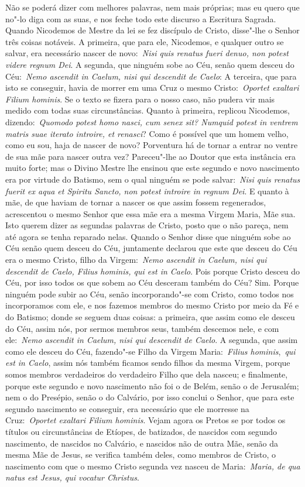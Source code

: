 Não se poderá dizer com melhores palavras, nem mais
próprias; mas eu quero que no"-lo diga com as suas, e nos feche todo este
discurso a Escritura Sagrada. Quando Nicodemos de Mestre da lei se fez
discípulo de Cristo, disse"-lhe o Senhor três coisas notáveis. A
primeira, que para ele, Nicodemos, e qualquer outro se salvar, era
necessário nascer de novo:~\emph{Nisi quis renatus fueri denuo, non
potest videre regnum Dei}. A segunda, que ninguém sobe
ao Céu, senão quem desceu do Céu:~\emph{Nemo ascendit in Caelum, nisi
qui descendit de Caelo}: A terceira, que para isto se
conseguir, havia de morrer em uma Cruz o mesmo Cristo:~\emph{Oportet
exaltari Filium hominis}. Se o texto se fizera para o
nosso caso, não pudera vir mais medido com todas suas circunstâncias.
Quanto à primeira, replicou Nicodemos, dizendo:~\emph{Quomodo potest
homo nasci, cum senex sit? Numquid potest in ventrem matris suae iterato
introire, et renasci}? Como é possível que um homem velho, como eu sou,
haja de nascer de novo? Porventura há de tornar a entrar no ventre de
sua mãe para nascer outra vez? Pareceu"-lhe ao Doutor que esta instância
era muito forte; mas o Divino Mestre lhe ensinou que este segundo e novo
nascimento era por virtude do Batismo, sem o qual ninguém se pode
salvar:~\emph{Nisi quis renatus fuerit ex aqua et Spiritu Sancto, non
potest introire in regnum Dei}. E quanto à mãe, de que haviam de tornar
a nascer os que assim fossem regenerados, acrescentou o mesmo Senhor que
essa mãe era a mesma Virgem Maria, Mãe sua. Isto querem dizer as
segundas palavras de Cristo, posto que o não pareça, nem até agora se
tenha reparado nelas. Quando o Senhor disse que ninguém sobe ao Céu
senão quem desceu do Céu, juntamente declarou que este que desceu do Céu
era o mesmo Cristo, filho da Virgem:~\emph{Nemo ascendit in Caelum, nisi
qui descendit de Caelo, Filius hominis, qui est in Caelo}. Pois porque
Cristo desceu do Céu, por isso todos os que sobem ao Céu desceram também
do Céu? Sim. Porque ninguém pode subir ao Céu, senão incorporando"-se com
Cristo, como todos nos incorporamos com ele, e nos fazemos membros do
mesmo Cristo por meio da Fé e do Batismo; donde se seguem duas coisas: a
primeira, que assim como ele desceu do Céu, assim nós, por sermos
membros seus, também descemos nele, e com ele:~\emph{Nemo ascendit in
Caelum, nisi qui descendit de Caelo}. A segunda, que assim como ele
desceu do Céu, fazendo"-se Filho da Virgem Maria:~\emph{Filius
hominis},~\emph{qui est in Caelo}, assim nós também ficamos sendo filhos
da mesma Virgem, porque somos membros verdadeiros do verdadeiro Filho
que dela nasceu; e finalmente, porque este segundo e novo nascimento não
foi o de Belém, senão o de Jerusalém; nem o do Presépio, senão o do
Calvário, por isso conclui o Senhor, que para este segundo nascimento se
conseguir, era necessário que ele morresse na Cruz:~\emph{Oportet
exaltari Filium hominis}. Vejam agora os Pretos se por todos os títulos
ou circunstâncias de Etíopes, de batizados, de nascidos com segundo
nascimento, de nascidos no Calvário, e nascidos não de outra Mãe, senão
da mesma Mãe de Jesus, se verifica também deles, como membros de Cristo,
o nascimento com que o mesmo Cristo segunda vez nasceu de
Maria:~\emph{Maria, de qua natus est Jesus, qui vocatur Christus}.


